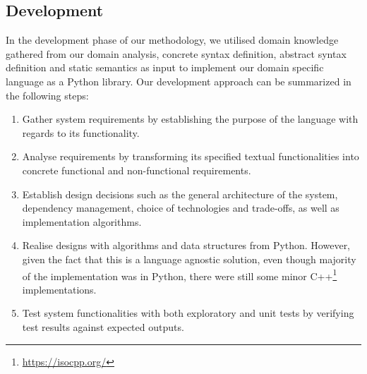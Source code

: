 \documentclass[conference]{IEEEtran}
\newcommand{\foot}[1]{\footnote{\url{#1}}}
\begin{document}
\subsection{Development}
In the development phase of our methodology, we utilised domain knowledge gathered from our domain analysis, concrete syntax definition, abstract syntax definition and static semantics as input to implement our domain specific language as a Python library. Our development approach can be summarized in the following steps:
\begin{enumerate}
    \item Gather system requirements by establishing the purpose of the language with regards to its functionality.
    \item Analyse requirements by transforming its specified textual functionalities into concrete functional and non-functional requirements.
    \item Establish design decisions such as the general architecture of the system, dependency management, choice of technologies and trade-offs, as well as implementation algorithms.
    \item Realise designs with algorithms and data structures from Python. However, given the fact that this is a language agnostic solution, even though majority of the implementation was in Python, there were still some minor C++\foot{https://isocpp.org/} implementations.
    \item Test system functionalities with both exploratory and unit tests by verifying test results against expected outputs.
 \end{enumerate}
 
\end{document}
